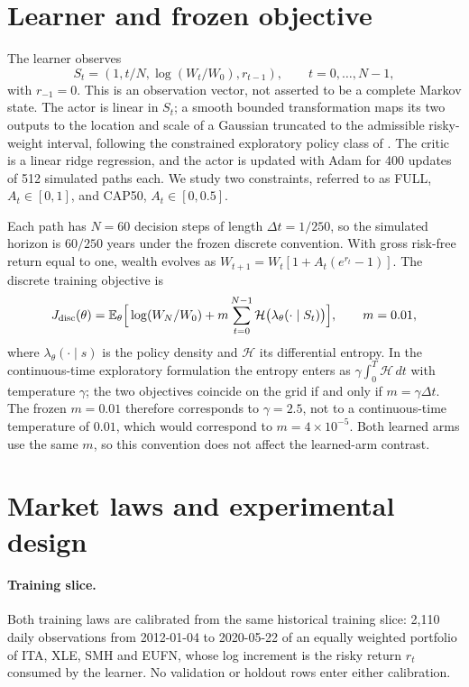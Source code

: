 \documentclass[11pt]{article}
\newcommand{\E}{\mathbb E}
\begin{document}
\section{Learner and frozen objective}
The learner observes
\[
S_t=\left(1,t/N,\log(W_t/W_0),r_{t-1}\right),\qquad t=0,\dots,N-1,
\]
with $r_{-1}=0$. This is an observation vector, not asserted to be a complete Markov state. The actor is linear in $S_t$; a smooth bounded transformation maps its two outputs to the location and scale of a Gaussian truncated to the admissible risky-weight interval, following the constrained exploratory policy class of \cite{ChauNguyenNguyen2026}. The critic is a linear ridge regression, and the actor is updated with Adam for 400 updates of 512 simulated paths each. We study two constraints, referred to as FULL, $A_t\in[0,1]$, and CAP50, $A_t\in[0,0.5]$.

Each path has $N=60$ decision steps of length $\Delta t=1/250$, so the simulated horizon is $60/250$ years under the frozen discrete convention. With gross risk-free return equal to one, wealth evolves as $W_{t+1}=W_t[1+A_t(e^{r_t}-1)]$. The discrete training objective is
\[
J_{\rm disc}(\theta)=\E_\theta\Big[\log(W_N/W_0)+m\sum_{t=0}^{N-1}\mathcal H\big(\lambda_\theta(\cdot\mid S_t)\big)\Big],\qquad m=0.01,
\]
where $\lambda_\theta(\cdot\mid s)$ is the policy density and $\mathcal H$ its differential entropy. In the continuous-time exploratory formulation \cite{WangZariphopoulouZhou2020,ChauNguyenNguyen2026} the entropy enters as $\gamma\int_0^T\mathcal H\,dt$ with temperature $\gamma$; the two objectives coincide on the grid if and only if $m=\gamma\Delta t$. The frozen $m=0.01$ therefore corresponds to $\gamma=2.5$, not to a continuous-time temperature of $0.01$, which would correspond to $m=4\times10^{-5}$. Both learned arms use the same $m$, so this convention does not affect the learned-arm contrast.

\section{Market laws and experimental design}
\paragraph{Training slice.} Both training laws are calibrated from the same historical training slice: 2,110 daily observations from 2012-01-04 to 2020-05-22 of an equally weighted portfolio of ITA, XLE, SMH and EUFN, whose log increment is the risky return $r_t$ consumed by the learner. No validation or holdout rows enter either calibration.
\end{document}

